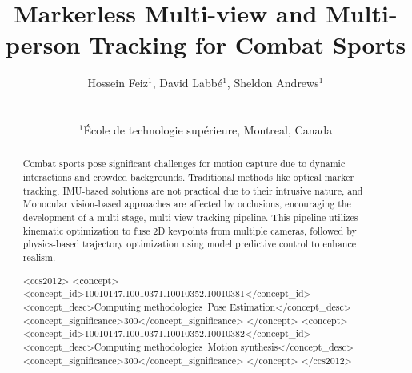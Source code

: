 \documentclass{egpubl}
\title{Markerless Multi-view and Multi-person Tracking for Combat Sports}
\author[Hossein, Labbé, and Andrews]
{\parbox{\textwidth}{\centering 
        Hossein Feiz$^1$, David Labbé$^1$, Sheldon Andrews$^1$
        }
        \\
{\parbox{\textwidth}{\centering 
        $^1$École de technologie supérieure, Montreal, Canada
       }
}
}
\begin{document}

\maketitle

\begin{abstract}
   Combat sports pose significant challenges for motion capture due to dynamic interactions and crowded backgrounds. Traditional methods like optical marker tracking, IMU-based solutions are not practical due to their intrusive nature, and Monocular vision-based approaches are affected by occlusions, encouraging the development of a multi-stage, multi-view tracking pipeline. This pipeline utilizes kinematic optimization to fuse 2D keypoints from multiple cameras, followed by physics-based trajectory optimization using model predictive control to enhance realism.


\begin{CCSXML}
<ccs2012>
<concept>
<concept_id>10010147.10010371.10010352.10010381</concept_id>
<concept_desc>Computing methodologies~Pose Estimation</concept_desc>
<concept_significance>300</concept_significance>
</concept>
<concept>
<concept_id>10010147.10010371.10010352.10010382</concept_id>
<concept_desc>Computing methodologies~Motion synthesis</concept_desc>
<concept_significance>300</concept_significance>
</concept>
</ccs2012>
\end{CCSXML}



\printccsdesc   
\end{abstract}  
\end{document}
